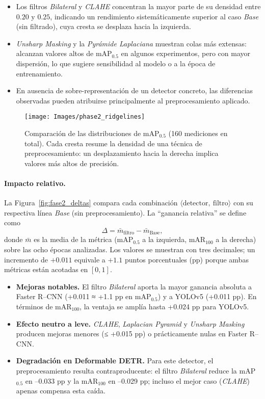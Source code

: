 \begin{itemize}
  \item Los filtros \textit{Bilateral} y \textit{CLAHE} concentran la mayor parte de su densidad entre \(0.20\) y \(0.25\), indicando un rendimiento sistemáticamente superior al caso \textit{Base} (sin filtrado), cuya cresta se desplaza hacia la izquierda.
  \item \textit{Unsharp Masking} y la \textit{Pyrámide Laplaciana} muestran colas más extensas: alcanzan valores altos de mAP\(_{0.5}\) en algunos experimentos, pero con mayor dispersión, lo que sugiere sensibilidad al modelo o a la época de entrenamiento.
  \item En ausencia de sobre-representación de un detector concreto, las diferencias observadas pueden atribuirse principalmente al preprocesamiento aplicado.
\end{itemize}

\begin{figure}[!ht]
  \centering
  \texttt{[image: Images/phase2\_ridgelines]}
  \caption[Distribución de mAP\(_{0.5}\) por técnica]{Comparación de las distribuciones de mAP\(_{0.5}\) (160 mediciones en total).
           Cada cresta resume la densidad de una técnica de preprocesamiento: un desplazamiento hacia la derecha implica valores más altos de precisión.}
  \label{fig:fase2_ridges}
\end{figure}

\paragraph{Impacto relativo.}
La Figura~\ref{fig:fase2_deltas} compara cada combinación \(\langle\text{detector},\ \text{filtro}\rangle\) con su respectiva línea \textit{Base} (sin preprocesamiento).
La “ganancia relativa” se define como
\[
  \Delta = \bar{m}_{\text{filtro}} - \bar{m}_{\text{Base}},
\]
donde \(\bar{m}\) es la media de la métrica (mAP\(_{0.5}\) a la izquierda, mAR\(_{100}\) a la derecha) sobre las ocho épocas analizadas.
Los valores se muestran con tres decimales; un incremento de \(+0.011\) equivale a \(+1.1\) puntos porcentuales (pp) porque ambas métricas están acotadas en \([0,1]\).

\begin{itemize}
  \item \textbf{Mejoras notables.}
        El filtro \emph{Bilateral} aporta la mayor ganancia absoluta a Faster R–CNN (+0.011 ≈ +1.1 pp en mAP\(_{0.5}\)) y a YOLOv5 (+0.011 pp).
        En términos de mAR\(_{100}\), la ventaja se amplía hasta +0.024 pp para YOLOv5.
  \item \textbf{Efecto neutro a leve.}
        \emph{CLAHE}, \emph{Laplacian Pyramid} y \emph{Unsharp Masking} producen mejoras menores (≤ +0.015 pp) o prácticamente nulas en Faster R–CNN.
  \item \textbf{Degradación en Deformable DETR.}
        Para este detector, el preprocesamiento resulta contraproducente: el filtro \emph{Bilateral} reduce la mAP\(_{0.5}\) en –0.033 pp y la mAR\(_{100}\) en –0.029 pp; incluso el mejor caso (\emph{CLAHE}) apenas compensa esta caída.
\end{itemize}


